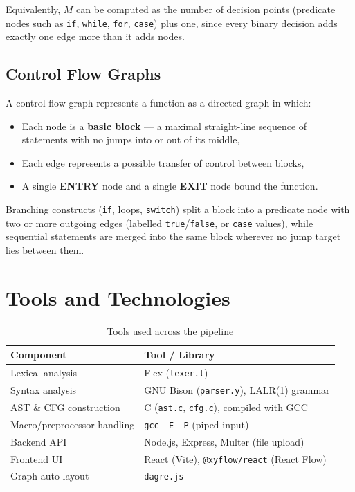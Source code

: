 \documentclass[11pt]{article}
\begin{document}
Equivalently, $M$ can be computed as the number of decision points (predicate nodes such as \texttt{if}, \texttt{while}, \texttt{for}, \texttt{case}) plus one, since every binary decision adds exactly one edge more than it adds nodes.

\subsection{Control Flow Graphs}
A control flow graph represents a function as a directed graph in which:
\begin{itemize}
    \item Each node is a \textbf{basic block} — a maximal straight-line sequence of statements with no jumps into or out of its middle,
    \item Each edge represents a possible transfer of control between blocks,
    \item A single \textbf{ENTRY} node and a single \textbf{EXIT} node bound the function.
\end{itemize}
Branching constructs (\texttt{if}, loops, \texttt{switch}) split a block into a predicate node with two or more outgoing edges (labelled \texttt{true}/\texttt{false}, or \texttt{case} values), while sequential statements are merged into the same block wherever no jump target lies between them.

\section{Tools and Technologies}
\begin{table}[h]
\centering
\begin{tabular}{@{}ll@{}}
\toprule
\textbf{Component} & \textbf{Tool / Library} \\
\midrule
Lexical analysis & Flex (\texttt{lexer.l}) \\
Syntax analysis & GNU Bison (\texttt{parser.y}), LALR(1) grammar \\
AST \& CFG construction & C (\texttt{ast.c}, \texttt{cfg.c}), compiled with GCC \\
Macro/preprocessor handling & \texttt{gcc -E -P} (piped input) \\
Backend API & Node.js, Express, Multer (file upload) \\
Frontend UI & React (Vite), \texttt{@xyflow/react} (React Flow) \\
Graph auto-layout & \texttt{dagre.js} \\
\bottomrule
\end{tabular}
\caption{Tools used across the pipeline}
\end{table}
\end{document}
